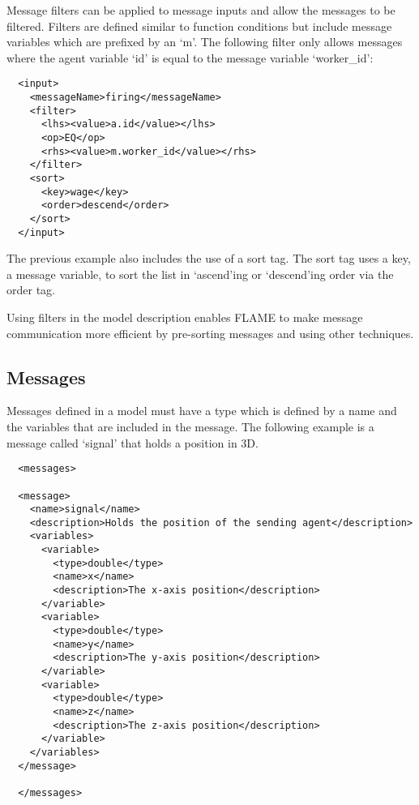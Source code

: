Message filters can be applied to message inputs and allow the messages to be
filtered. Filters are defined similar to function conditions but include
message variables which are prefixed by an `m'. The following filter only
allows messages where the agent variable `id' is equal to the message variable
`worker\_id':

\begin{verbatim}
  <input>
    <messageName>firing</messageName>
    <filter>
      <lhs><value>a.id</value></lhs>
      <op>EQ</op>
      <rhs><value>m.worker_id</value></rhs>
    </filter>
    <sort>
      <key>wage</key>
      <order>descend</order>
    </sort>
  </input>
\end{verbatim}

The previous example also includes the use of a sort tag. The sort tag uses a
key, a message variable, to sort the list in `ascend'ing or `descend'ing order
via the order tag.

Using filters in the model description enables FLAME to make message
communication more efficient by pre-sorting messages and using other techniques.


\subsection{Messages}

Messages defined in a model must have a type which is defined by a name and the
variables that are included in the message. The following example is a message
called `signal' that holds a position in 3D.
\clearpage
\begin{verbatim}
  <messages>
  
  <message>
    <name>signal</name>
    <description>Holds the position of the sending agent</description>
    <variables>
      <variable>
        <type>double</type>
        <name>x</name>
        <description>The x-axis position</description>
      </variable>
      <variable>
        <type>double</type>
        <name>y</name>
        <description>The y-axis position</description>
      </variable>
      <variable>
        <type>double</type>
        <name>z</name>
        <description>The z-axis position</description>
      </variable>
    </variables>
  </message>
  
  </messages>
\end{verbatim}
